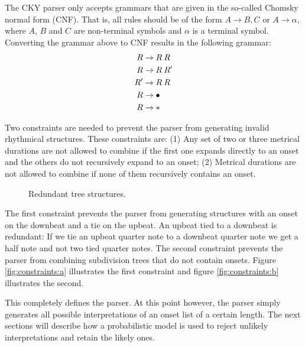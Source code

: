 The CKY parser only accepts grammars that are given in the so-called Chomsky normal form (CNF). That is, all rules should be of the form $A \rightarrow B, C$ or $A \rightarrow \alpha$, where $A$, $B$ and $C$ are non-terminal symbols and $\alpha$ is a terminal symbol. Converting the grammar above to CNF results in the following grammar:
\begin{align}
\label{eq:grammar_cnf}
R &\rightarrow R\: R\\ \notag
R &\rightarrow R\: R'\\ \notag
R' &\rightarrow R\: R\\ \notag
R &\rightarrow \bullet\\ \notag
R &\rightarrow * \notag
\end{align}

Two constraints are needed to prevent the parser from generating invalid rhythmical structures. These constraints are: (1) Any set of two or three metrical durations are not allowed to combine if the first one expands directly to an onset and the others do not recursively expand to an onset; (2) Metrical durations are not allowed to combine if none of them recursively contains an onset.

\begin{figure}
\centering
{}
\qquad
{}
\caption{Redundant tree structures.}
\label{fig:constraints}
\end{figure}

The first constraint prevents the parser from generating structures with an onset on the downbeat and a tie on the upbeat. An upbeat tied to a downbeat is redundant: If we tie an upbeat quarter note to a downbeat quarter note we get a half note and not two tied quarter notes. The second constraint prevents the parser from combining subdivision trees that do not contain onsets. Figure \ref{fig:constraints:a} illustrates the first constraint and figure \ref{fig:constraints:b} illustrates the second.


This completely defines the parser. At this point however, the parser simply generates all possible interpretations of an onset list of a certain length. The next sections will describe how a probabilistic model is used to reject unlikely interpretations and retain the likely ones.

